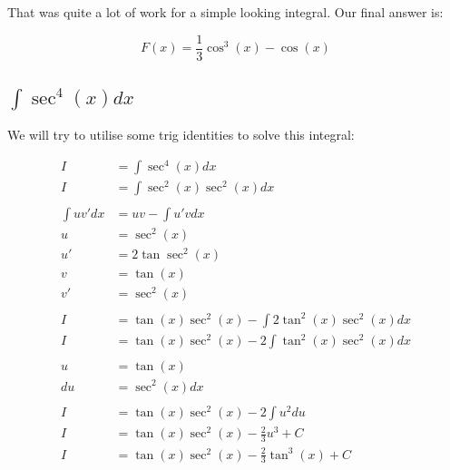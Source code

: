 \documentclass[12pt]{article}
\begin{document}
That was quite a lot of work for a simple looking integral. Our final answer is:

$$
    F(x) = \frac{1}{3}\cos^3(x) - \cos(x)
$$

\subsection{$\int \sec^4(x) dx$}

We will try to utilise some trig identities to solve this integral:


\begin{align}
    I              & = \int \sec^4(x) dx                                 \\
    I              & = \int \sec^2(x)\sec^2(x) dx                        \\
    \nonumber                                                            \\
    \int uv' dx    & = uv - \int u'v dx                                  \\
    u              & = \sec^2(x)                                         \\
    u'             & = 2\tan\sec^2(x)                                    \\
    v              & = \tan(x)                                           \\
    v'             & = \sec^2(x)                                         \\
    \nonumber                                                            \\
    I              & = \tan(x)\sec^2(x) - \int 2\tan^2(x)\sec^2(x) dx    \\
    I              & = \tan(x)\sec^2(x) - 2\int \tan^2(x)\sec^2(x) dx    \\
    \nonumber                                                            \\
    u              & = \tan(x)                                           \\
    du             & = \sec^2(x) dx                                      \\
    \nonumber                                                            \\
    I              & = \tan(x)\sec^2(x) - 2\int u^2 du                   \\
    I              & = \tan(x)\sec^2(x) - \frac{2}{3}u^3 + C             \\
    I              & = \tan(x)\sec^2(x) - \frac{2}{3}\tan^3(x) + C       \\

\end{align}
\end{document}

